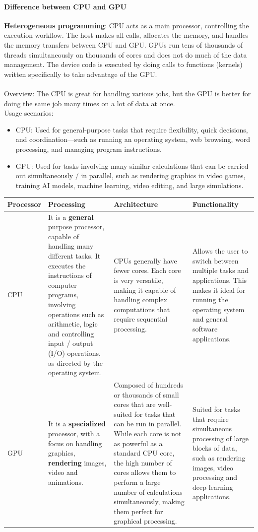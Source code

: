 \documentclass[a4paper,12pt]{article}
\begin{document}
\paragraph{Difference between CPU and GPU}
\textbf{Heterogeneous programming}: CPU acts as a main processor, controlling the execution workflow. The host makes all calls, allocates the memory, and handles the memory transfers between CPU and GPU. GPUs run tens of thousands of threads simultaneously on thousands of cores and does not do much of the data management. The device code is executed by doing calls to functions (kernels) written specifically to take advantage of the GPU. \\\\
Overview: The CPU is great for handling various jobs, but the GPU is better for doing the same job many times on a lot of data at once.\\
Usage scenarios:
\begin{itemize}
\item  CPU: Used for general-purpose tasks that require flexibility, quick decisions, and
coordination—such as running an operating system, web browsing, word processing, and managing program instructions.
\item  GPU: Used for tasks involving many similar calculations that can be carried out simultaneously / in parallel, such as rendering graphics in video games, training AI models, machine learning, video editing, and large simulations.
\end{itemize}
\begin{center}
    \begin{tabular}{|p{2.2cm}|p{4.5cm}|p{6.5cm}|p{4.5cm}|}
\hline
\textbf{Processor} & \textbf{Processing} & \textbf{Architecture} & \textbf{Functionality} \\
\hline
CPU & It is a \textbf{general} purpose processor, capable of handling many different tasks. It executes the instructions of computer programs, involving operations such as arithmetic, logic and controlling input / output (I/O) operations, as directed by the operating system. & CPUs generally have fewer cores. Each core is very versatile, making it capable of handling complex computations that require sequential processing. & Allows the user to switch between multiple tasks and applications. This makes it ideal for running the operating system and general software applications. \\
\hline
GPU & It is a \textbf{specialized} processor, with a focus on handling graphics, \textbf{rendering} images, video and animations. & Composed of hundreds or thousands of small cores that are well-suited for tasks that can be run in parallel. While each core is not as powerful as a standard CPU core, the high number of cores allows them to perform a large number of calculations simultaneously, making them perfect for graphical processing. & Suited for tasks that require simultaneous processing of large blocks of data, such as rendering images, video processing and deep learning applications. \\
\hline
\end{tabular}
\end{center}
\end{document}
